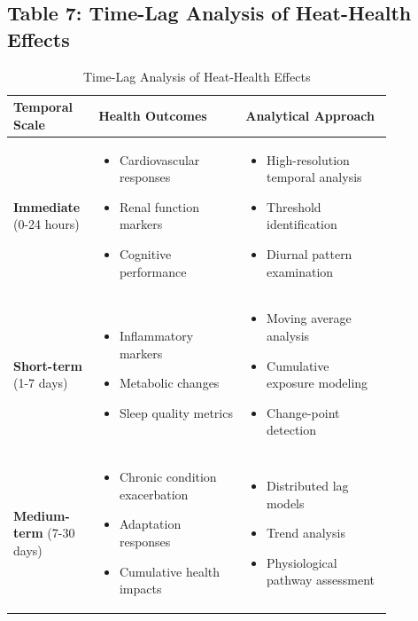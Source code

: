 \documentclass[12pt,a4paper,landscape]{article}
\begin{document}
\subsection*{Table 7: Time-Lag Analysis of Heat-Health Effects}
\begin{table}[H]
\centering
\caption{Time-Lag Analysis of Heat-Health Effects}
\label{tab:time_lag}
\begin{tabular}{L{0.15\linewidth}L{0.35\linewidth}L{0.35\linewidth}}
\toprule
\textbf{Temporal Scale} & \textbf{Health Outcomes} & \textbf{Analytical Approach} \\
\midrule
\textbf{Immediate} \newline(0-24 hours) & 
\begin{itemize}[leftmargin=*]
    \item Cardiovascular responses
    \item Renal function markers
    \item Cognitive performance
\end{itemize} & 
\begin{itemize}[leftmargin=*]
    \item High-resolution temporal analysis
    \item Threshold identification
    \item Diurnal pattern examination
\end{itemize} \\
\midrule
\textbf{Short-term} \newline(1-7 days) & 
\begin{itemize}[leftmargin=*]
    \item Inflammatory markers
    \item Metabolic changes
    \item Sleep quality metrics
\end{itemize} & 
\begin{itemize}[leftmargin=*]
    \item Moving average analysis
    \item Cumulative exposure modeling
    \item Change-point detection
\end{itemize} \\
\midrule
\textbf{Medium-term} \newline(7-30 days) & 
\begin{itemize}[leftmargin=*]
    \item Chronic condition exacerbation
    \item Adaptation responses
    \item Cumulative health impacts
\end{itemize} & 
\begin{itemize}[leftmargin=*]
    \item Distributed lag models
    \item Trend analysis
    \item Physiological pathway assessment
\end{itemize} \\
\bottomrule
\end{tabular}
\end{table}
\end{document}
